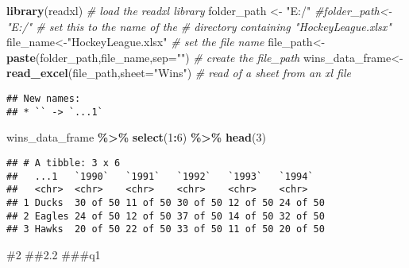 \documentclass[
]{article}
\newenvironment{Shaded}{\begin{snugshade}}{\end{snugshade}}
\newcommand{\AttributeTok}[1]{\textcolor[rgb]{0.13,0.29,0.53}{#1}}
\newcommand{\CommentTok}[1]{\textcolor[rgb]{0.56,0.35,0.01}{\textit{#1}}}
\newcommand{\DecValTok}[1]{\textcolor[rgb]{0.00,0.00,0.81}{#1}}
\newcommand{\FunctionTok}[1]{\textcolor[rgb]{0.13,0.29,0.53}{\textbf{#1}}}
\newcommand{\NormalTok}[1]{#1}
\newcommand{\OtherTok}[1]{\textcolor[rgb]{0.56,0.35,0.01}{#1}}
\newcommand{\SpecialCharTok}[1]{\textcolor[rgb]{0.81,0.36,0.00}{\textbf{#1}}}
\newcommand{\StringTok}[1]{\textcolor[rgb]{0.31,0.60,0.02}{#1}}
\begin{document}
\begin{Shaded}
\begin{Highlighting}[]
\FunctionTok{library}\NormalTok{(readxl) }\CommentTok{\# load the readxl library}
\NormalTok{folder\_path }\OtherTok{\textless{}{-}} \StringTok{"E:/"}
\CommentTok{\#folder\_path\textless{}{-}"E:/" \# set this to the name of the}
\CommentTok{\# directory containing "HockeyLeague.xlsx"}
\NormalTok{file\_name}\OtherTok{\textless{}{-}}\StringTok{"HockeyLeague.xlsx"} \CommentTok{\# set the file name}
\NormalTok{file\_path}\OtherTok{\textless{}{-}}\FunctionTok{paste}\NormalTok{(folder\_path,file\_name,}\AttributeTok{sep=}\StringTok{""}\NormalTok{) }\CommentTok{\# create the file\_path}
\NormalTok{wins\_data\_frame}\OtherTok{\textless{}{-}}\FunctionTok{read\_excel}\NormalTok{(file\_path,}\AttributeTok{sheet=}\StringTok{"Wins"}\NormalTok{) }\CommentTok{\# read of a sheet from an xl file}
\end{Highlighting}
\end{Shaded}

\begin{verbatim}
## New names:
## * `` -> `...1`
\end{verbatim}

\begin{Shaded}
\begin{Highlighting}[]
\NormalTok{wins\_data\_frame }\SpecialCharTok{\%\textgreater{}\%}
  \FunctionTok{select}\NormalTok{(}\DecValTok{1}\SpecialCharTok{:}\DecValTok{6}\NormalTok{) }\SpecialCharTok{\%\textgreater{}\%}
  \FunctionTok{head}\NormalTok{(}\DecValTok{3}\NormalTok{)}
\end{Highlighting}
\end{Shaded}

\begin{verbatim}
## # A tibble: 3 x 6
##   ...1   `1990`   `1991`   `1992`   `1993`   `1994`  
##   <chr>  <chr>    <chr>    <chr>    <chr>    <chr>   
## 1 Ducks  30 of 50 11 of 50 30 of 50 12 of 50 24 of 50
## 2 Eagles 24 of 50 12 of 50 37 of 50 14 of 50 32 of 50
## 3 Hawks  20 of 50 22 of 50 33 of 50 11 of 50 20 of 50
\end{verbatim}

\#2 \#\#2.2 \#\#\#q1
\end{document}
